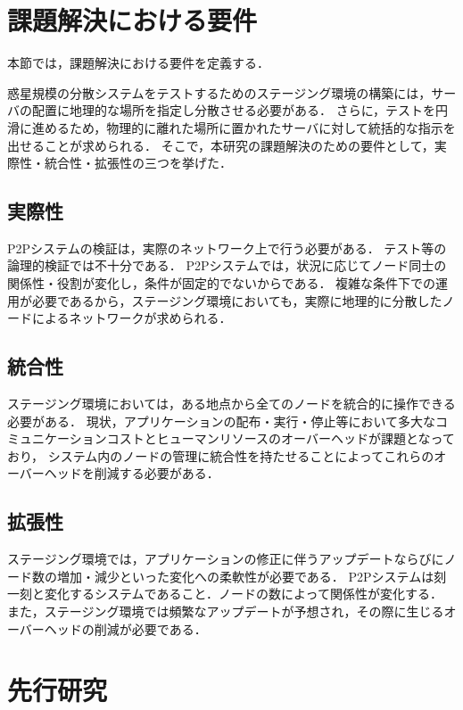 \section{課題解決における要件}
\label{issue:requirements}

本節では，課題解決における要件を定義する．

惑星規模の分散システムをテストするためのステージング環境の構築には，サーバの配置に地理的な場所を指定し分散させる必要がある．
さらに，テストを円滑に進めるため，物理的に離れた場所に置かれたサーバに対して統括的な指示を出せることが求められる．
そこで，本研究の課題解決のための要件として，実際性・統合性・拡張性の三つを挙げた．

\subsection{実際性}
\label{issue:requirements1}

P2Pシステムの検証は，実際のネットワーク上で行う必要がある．
テスト等の論理的検証では不十分である．
P2Pシステムでは，状況に応じてノード同士の関係性・役割が変化し，条件が固定的でないからである．
複雑な条件下での運用が必要であるから，ステージング環境においても，実際に地理的に分散したノードによるネットワークが求められる．

\subsection{統合性}
\label{issue:requirements2}

ステージング環境においては，ある地点から全てのノードを統合的に操作できる必要がある．
現状，アプリケーションの配布・実行・停止等において多大なコミュニケーションコストとヒューマンリソースのオーバーヘッドが課題となっており，
システム内のノードの管理に統合性を持たせることによってこれらのオーバーヘッドを削減する必要がある．

\subsection{拡張性}
\label{issue:requirements3}

ステージング環境では，アプリケーションの修正に伴うアップデートならびにノード数の増加・減少といった変化への柔軟性が必要である．
P2Pシステムは刻一刻と変化するシステムであること．ノードの数によって関係性が変化する．
また，ステージング環境では頻繁なアップデートが予想され，その際に生じるオーバーヘッドの削減が必要である．

\section{先行研究}
\label{issue:previous-research}

